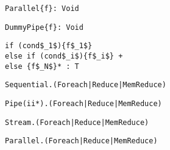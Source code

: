\begin{table*}
\newsavebox{\parallelSignature}
\begin{lrbox}{\parallelSignature}
\begin{lstlisting}[language=SpatialTable]
Parallel{f}: Void
\end{lstlisting}
\end{lrbox}

\newsavebox{\pipeSignature}
\begin{lrbox}{\pipeSignature}
\begin{lstlisting}[language=SpatialTable]
DummyPipe{f}: Void
\end{lstlisting}
\end{lrbox}

\newsavebox{\ifSignature}
\begin{lrbox}{\ifSignature}
\begin{lstlisting}[language=SpatialTable]
if (cond$_1$){f$_1$}
else if (cond$_i$){f$_i$} +
else {f$_N$}* : T
\end{lstlisting}
\end{lrbox}

\newsavebox{\sequentialTag}
\begin{lrbox}{\sequentialTag}
\begin{lstlisting}[language=SpatialTable]
Sequential.(Foreach|Reduce|MemReduce)
\end{lstlisting}
\end{lrbox}

\newsavebox{\pipeTag}
\begin{lrbox}{\pipeTag}
\begin{lstlisting}[language=SpatialTable]
Pipe(ii*).(Foreach|Reduce|MemReduce)
\end{lstlisting}
\end{lrbox}

\newsavebox{\streamTag}
\begin{lrbox}{\streamTag}
\begin{lstlisting}[language=SpatialTable]
Stream.(Foreach|Reduce|MemReduce)
\end{lstlisting}
\end{lrbox}

\newsavebox{\parallelTag}
\begin{lrbox}{\parallelTag}
\begin{lstlisting}[language=SpatialTable]
Parallel.(Foreach|Reduce|MemReduce)
\end{lstlisting}
\end{lrbox}


\end{table*}
